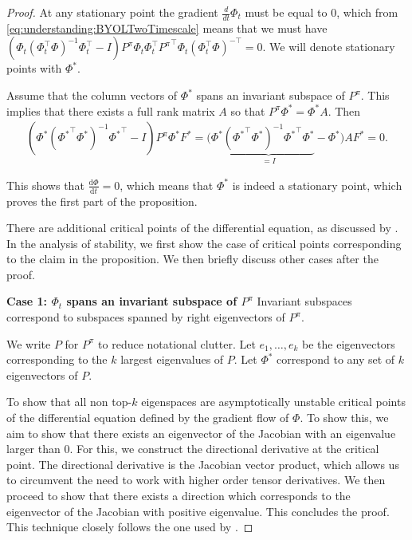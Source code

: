 \begin{proof}
    At any stationary point the gradient $\frac{d}{dt}\Phi_t$ must be equal to $0$, which from \cref{eq:understanding:BYOLTwoTimescale} means that we must have $\left(\Phi_t\left(\Phi^\top_t \Phi\right)^{-1}\Phi_t^\top - I\right)P^\pi\Phi_t \Phi_t^\top {P^\pi}^\top \Phi_t\left(\Phi^\top_t \Phi\right)^{-\top}=0$.
    We will denote stationary points with $\Phi^*$.

    Assume that the column vectors of $\Phi^*$ spans an invariant subspace of $P^\pi$. This implies that there exists a full rank matrix $A$ so that $P^\pi \Phi^* = \Phi^*A$.
    Then 
    \begin{align}
    \left(\Phi^*\left({\Phi^*}^\top \Phi^*\right)^{-1}{\Phi^*}^\top - I\right)P^\pi\Phi^* F^*=\Big(\Phi^*\underbrace{\left({\Phi^*}^\top \Phi^*\right)^{-1}{\Phi^*}^\top\Phi^*}_{=I} - \Phi^*\Big)A F^*=0. \label{eq:understanding:stationary}
    \end{align}

This shows that $\frac{\mathrm{d}\Phi}{\mathrm{d}t} = 0$, which means that $\Phi^*$ is indeed a stationary point, which proves the first part of the proposition.

There are additional critical points of the differential equation, as discussed by \textcite{tang2022understanding}.
In the analysis of stability, we first show the case of critical points corresponding to the claim in the proposition.
We then briefly discuss other cases after the proof.

\textbf{Case 1: $\Phi_t$ spans an invariant subspace of $P^\pi$}
Invariant subspaces correspond to subspaces spanned by right eigenvectors of $P^\pi$.

We write $P$ for $P^\pi$ to reduce notational clutter.
Let $e_1,\dots,e_k$ be the eigenvectors corresponding to the $k$ largest eigenvalues of $P$.
Let $\Phi^*$ correspond to any set of $k$ eigenvectors of $P$. 

To show that all non top-$k$ eigenspaces are asymptotically unstable critical points of the differential equation defined by the gradient flow of $\Phi$.
To show this, we aim to show that there exists an eigenvector of the Jacobian with an eigenvalue larger than $0$.
For this, we construct the directional derivative at the critical point.
The directional derivative is the Jacobian vector product, which allows us to circumvent the need to work with higher order tensor derivatives.
We then proceed to show that there exists a direction which corresponds to the eigenvector of the Jacobian with positive eigenvalue.
This concludes the proof.
This technique closely follows the one used by \textcite{lelan2023bootstrapped}.


\end{proof}
